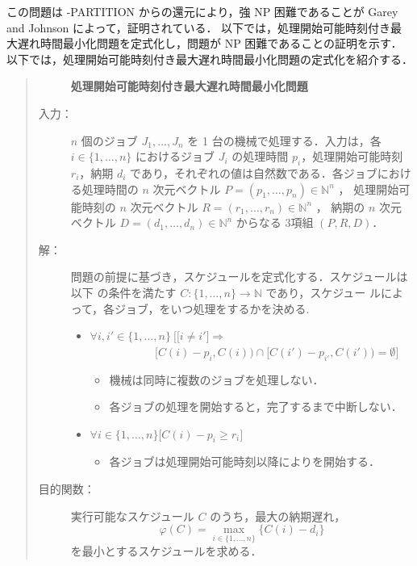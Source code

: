 \documentclass[12pt]{optlab-bachelor}
\begin{document}
この問題は {-PARTITION} からの還元により，強 NP 困難であることが Garey and Johnson \cite{3SAT}によって，証明されている．
以下では，処理開始可能時刻付き最大遅れ時間最小化問題を定式化し，問題が NP 困難であることの証明を示す．
以下では，処理開始可能時刻付き最大遅れ時間最小化問題の定式化を紹介する．
\begin{quote}
  \begin{description}
    \item[] {\bf 処理開始可能時刻付き最大遅れ時間最小化問題}
    \item[入力：] $n$ 個のジョブ $J_1,\ldots,J_n$ を 1 台の機械で処理する．入力は，各 $i \in \{1,\ldots,n\}$ におけるジョブ $J_i$ の処理時間 $p_i$，処理開始可能時刻
    $r_i$，納期 $d_i$ であり，それぞれの値は自然数である．各ジョブにおける処理時間の $n$ 次元ベクトル $P = (p_1,\ldots,p_n) \in \mathbb{N}^n$ ，
    処理開始可能時刻の $n$ 次元ベクトル $R = (r_1,\ldots,r_n) \in \mathbb{N}^n$ ，
    納期の $n$ 次元ベクトル $D = (d_1,\ldots,d_n) \in \mathbb{N}^n$ からなる 3項組 $(P,R,D)$．
    \item[解：] 問題の前提に基づき，スケジュールを定式化する．スケジュールは以下
    の条件を満たす $C : \{1,\ldots,n\} \to \mathbb{N}$ であり，スケジュー
    ルによって，各ジョブ，をいつ処理をするかを決める.
    \begin{itemize}
      \item $\forall i, i' \in \{1,\ldots,n\}\ \Big[ \big[i \neq i' \big] \Rightarrow$ \\ $~~~~~~~~~~~~~~~~~~~~~~~~~~[C(i) - p_i, C(i)) \cap [C(i') - p_{i'}, C(i')) = \emptyset \Big]$
      \begin{itemize}
        \item 機械は同時に複数のジョブを処理しない．
        \item 各ジョブの処理を開始すると，完了するまで中断しない．
      \end{itemize}
      \item  $\forall i \in \{1,\ldots,n\}\big[C(i) - p_i \ge r_i\big]$
      \begin{itemize}
        \item 各ジョブは処理開始可能時刻以降によりを開始する．
      \end{itemize}
    \end{itemize}
    \item[目的関数：] 実行可能なスケジュール $C$ のうち，最大の納期遅れ，
    \begin{displaymath}
      \varphi(C) = \max_{i \in \{1,\ldots,n\}}\{C(i) - d_i\}
    \end{displaymath}
    を最小とするスケジュールを求める．
  \end{description}
\end{quote}
\end{document}
